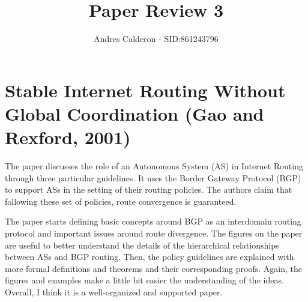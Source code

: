 \documentclass[a4paper,10pt]{scrartcl}
\title{Paper Review 3}
\author{Andres Calderon - SID:861243796}
\begin{document}
\maketitle
\thispagestyle{empty}

\section*{Stable Internet Routing Without Global Coordination (Gao and Rexford, 2001)}
The paper discusses the role of an Autonomous System (AS) in Internet Routing through three particular guidelines.  It uses the Border Gateway Protocol (BGP) to support ASs in the setting of their routing policies.  The authors claim that following these set of policies, route convergence is guaranteed.

The paper starts defining basic concepts around BGP as an interdomain routing protocol and important issues around route divergence.  The figures on the paper are useful to better understand the details of the hierarchical relationships between ASs and BGP routing. Then, the policy guidelines are explained with more formal definitions and theorems and their corresponding proofs.  Again, the figures and examples make a little bit easier the understanding of the ideas.  Overall, I think it is a well-organized and supported paper.


\end{document}
